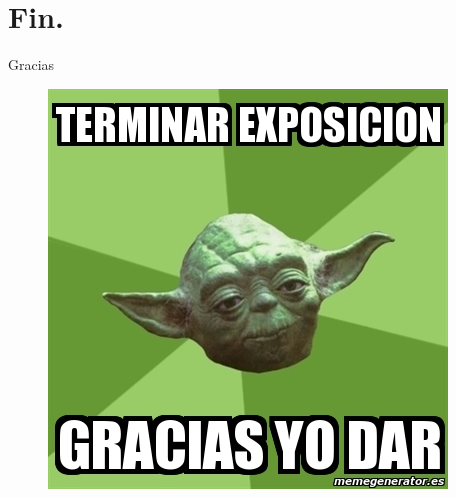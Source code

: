 \documentclass{beamer}
\begin{document}
\section{Fin.} %
\begin{frame}{Gracias}
  \begin{figure}
    \centering
    \includegraphics[width=.35 \paperwidth]{./images/Agradecimientos.jpg}
  \end{figure}
\end{frame}
\end{document}
